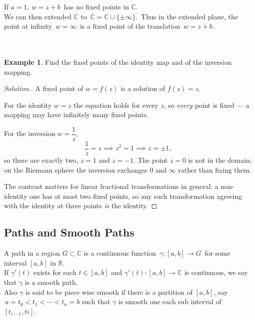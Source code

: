 \documentclass[11pt,a4paper]{article}
\theoremstyle{definition}
\newtheorem{example}[thm]{Example}
\newenvironment{solution}
  {\renewcommand{\qedsymbol}{}\begin{proof}[\textit{Solution}.]}
  {\end{proof}}
\begin{document}
If $a = 1,\, w = z + b\,$ has no fixed points in $\mathbb{C}$.\\

We can then extended $\mathbb{C}$ to $\, \overline{\mathbb{C}} = \mathbb{C}\cup \{\pm \infty\}.\,$ Thus in the extended plane, the point at infinity $\, w = \infty\,$ is a fixed point of the translation $\, w = z + b$.\\\\\\





\begin{example}
Find the fixed points of the identity map and of the inversion mapping.
\end{example}
\begin{solution}
A fixed point of $w=f(z)$ is a solution of $f(z)=z$.

For the identity $w=z$ the equation holds for every $z$, so \emph{every} point
is fixed --- a mapping may have infinitely many fixed points.

For the inversion $w=\dfrac{1}{z}$,
$$\frac{1}{z}=z\implies z^2=1\implies z=\pm 1 ,$$
so there are exactly two, $z=1$ and $z=-1$. The point $z=0$ is not in the
domain; on the Riemann sphere the inversion exchanges $0$ and $\infty$ rather
than fixing them.

The contrast matters for linear fractional transformations in general: a
non-identity one has at most two fixed points, so any such transformation
agreeing with the identity at three points \emph{is} the identity.
\end{solution}

{\color[wave]{485}\subsection{Paths and Smooth Paths}}
A path in a region $G\subset \mathbb{C}$ is a continuous function $\, \gamma : [a,b] \longrightarrow G\,$ for some interval $[a,b]$ in $\mathbb{R}$.\\

If $\gamma'(t)$ exists for each $t\in [a,b]$ and $\gamma'(t): [a,b]\longrightarrow \mathbb{C}$ is continuous, we say that $\gamma$ is a smooth path.\\

Also $\gamma$ is said to be piece wise smooth if there is a partition of $[a,b]$, say\\ $\, a = t_0 < t_1< \cdots < t_n = b$ such that $\gamma$ is smooth one each sub interval of $[t_{i-1},ti]$.\\
\end{document}
